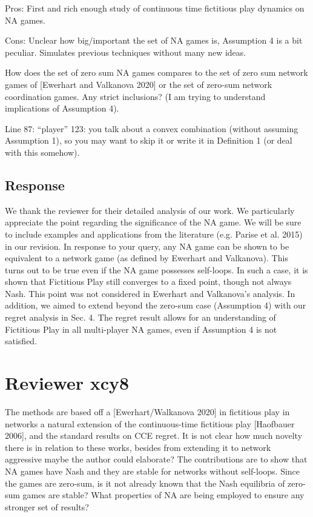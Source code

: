 \documentclass{article}
\begin{document}
	Pros: First and rich enough study of continuous time fictitious play dynamics on NA games.
	
	Cons: Unclear how big/important the set of NA games is, Assumption 4 is a bit peculiar. Simulates previous techniques without many new ideas.
	
	How does the set of zero sum NA games compares to the set of zero sum network games of [Ewerhart and Valkanova 2020] or the set of zero-sum network coordination games. Any strict inclusions? (I am trying to understand implications of Assumption 4).
	
	Line 87: “player” 123: you talk about a convex combination (without assuming Assumption 1), so you may want to skip it or write it in Definition 1 (or deal with this somehow).
	
	\subsection{Response}
	
	We thank the reviewer for their detailed analysis of our work. We particularly appreciate the point regarding the significance of the NA game. We will be sure to include examples and applications from the literature (e.g. Parise et al. 2015) in our revision. In response to your query, any NA game can be shown to be equivalent to a network game (as defined by Ewerhart and Valkanova). This turns out to be true even if the NA game possesses self-loops. In such a case, it is shown that Fictitious Play still converges to a fixed point, though not always Nash. This point was not considered in Ewerhart and Valkanova's analysis. In addition, we aimed to extend beyond the zero-sum case (Assumption 4) with our regret analysis in Sec. 4. The regret result allows for an understanding of Fictitious Play in all multi-player NA games, even if Assumption 4 is not satisfied.
	
	
	\section{Reviewer xcy8}
	
	The methods are based off a [Ewerhart/Walkanova 2020] in fictitious play in networks a natural extension of the continuous-time fictitious play [Haofbauer 2006], and the standard results on CCE regret. It is not clear how much novelty there is in relation to these works, besides from extending it to network aggressive maybe the author could elaborate? The contributions are to show that NA games have Nash and they are stable for networks without self-loops. Since the games are zero-sum, is it not already known that the Nash equilibria of zero-sum games are stable? What properties of NA are being employed to ensure any stronger set of results?
	
\end{document}
